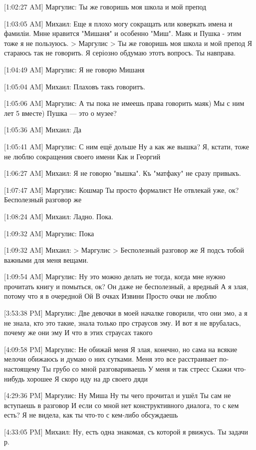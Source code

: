 \documentclass{article}
\newcommand{\yat}{{\fontencoding{X2}\selectfont\cyryat}} %
\begin{document}
[1:02:27 AM] Маргулис:
Ты же говоришь моя школа и мой препод

[1:03:05 AM] Михаил:
Еще я плохо могу сокращать или коверкать имена и фамиліи. Мн\yat не нравится "Мишаня" и особенно "Миш". Маяк и Пушка - этим тоже я не пользуюсь.
> Маргулис
> Ты же говоришь моя школа и мой препод
Я стараюсь так не говорить.
 Я серіозно обдумаю этотъ вопросъ. Ты нав права.

[1:04:49 AM] Маргулис:
Я не говорю Мишаня

[1:05:04 AM] Михаил:
Плаховъ такъ говоритъ.

[1:05:06 AM] Маргулис:
А ты пока не имеешь права говорить маяк)
 Мы с ним лет 5 вместе)
 Пушка — это о музее?

[1:05:36 AM] Михаил:
Да

[1:05:41 AM] Маргулис:
С ним ещё дольше
 Ну а как же вышка?
 Я, кстати, тоже не люблю сокращения своего имени
 Как и Георгий

[1:06:27 AM] Михаил:
Я не говорю "вышка".
 Къ "матфаку" не сразу привыкъ.

[1:07:47 AM] Маргулис:
Кошмар
 Ты просто формалист
 Не отвлекай уже, ок?
 Бесполезный разговор же

[1:08:24 AM] Михаил:
Ладно. Пока.

[1:09:32 AM] Маргулис:
Пока

[1:09:32 AM] Михаил:
> Маргулис
> Бесполезный разговор же
Я под съ тобой важными для меня вещами.

[1:09:54 AM] Маргулис:
Ну это можно делать не тогда, когда мне нужно прочитать книгу и помыться, ок?
 Он даже не бесполезный, а вредный
 А я злая, потому что я в очередной
 Ой
 В очках
 Извини
 Просто очки не люблю

[3:53:38 PM] Маргулис:
Две девочки в моей началке говорили, что они эмо, а я не знала, кто это такие, знала только про страусов эму. И вот я не врубалась, почему же они эму
 И что в этих страусах такого

[4:09:58 PM] Маргулис:
Не обижай меня
 Я злая, конечно, но сама на всякие мелочи обижаюсь и думаю о них сутками. Меня это все расстраивает по-настоящему
 Ты грубо со мной разговариваешь
 У меня и так стресс
 Скажи что-нибудь хорошее
 Я скоро иду на др своего дяди

[4:29:36 PM] Маргулис:
Ну Миша
 Ну ты чего прочитал и ушёл
 Ты сам не вступаешь в разговор
 И если со мной нет конструктивного диалога, то с кем есть?
 Я не видела, как ты что-то с кем-либо обсуждаешь

[4:33:05 PM] Михаил:
Ну, есть одна знакомая, съ которой я р вижусь.
 Ты задачи р.
\end{document}
